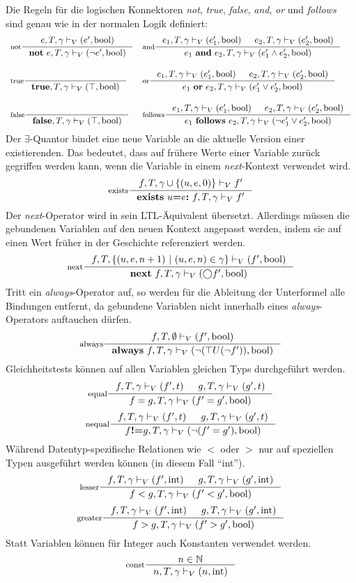 Die Regeln für die logischen Konnektoren \emph{not}, \emph{true}, \emph{false}, \emph{and}, \emph{or} und \emph{follows} sind genau wie in der normalen Logik definiert:
\[
\begin{array}{ll}
  \inference[not]{e,T,\gamma\vdash_V (e',\textrm{bool})}{\textbf{not}\ e,T,\gamma\vdash_V (\lnot e',\textrm{bool})} &
  \inference[and]{e_1,T,\gamma\vdash_V (e_1',\textrm{bool}) & e_2,T,\gamma\vdash_V (e_2',\textrm{bool})}{e_1\ \textbf{and}\ e_2,T,\gamma\vdash_V (e_1'\land e_2',\textrm{bool})}\\[20pt]
  \inference[true]{}{\textbf{true},T,\gamma\vdash_V(\top,\textrm{bool})} &
  \inference[or]{e_1,T,\gamma\vdash_V (e_1',\textrm{bool}) & e_2,T,\gamma\vdash_V (e_2',\textrm{bool})}{e_1\ \textbf{or}\ e_2,T,\gamma\vdash_V (e_1'\lor e_2',\textrm{bool})}\\[20pt]
  \inference[false]{}{\textbf{false},T,\gamma\vdash_V(\top,\textrm{bool})} &
  \inference[follows]{e_1,T,\gamma\vdash_V (e_1',\textrm{bool}) & e_2,T,\gamma\vdash_V (e_2',\textrm{bool})}{e_1\ \textbf{follows}\ e_2,T,\gamma\vdash_V (\lnot e_1'\lor e_2',\textrm{bool})}
\end{array}
\]
Der $\exists$-Quantor bindet eine neue Variable an die aktuelle Version einer existierenden.
Das bedeutet, dass auf frühere Werte einer Variable zurück gegriffen werden kann, wenn die Variable in einem \emph{next}-Kontext verwendet wird.
\[
\inference[exists]{f,T,\gamma\cup\{(u,e,0)\}\vdash_V f'}{\textbf{exists}\ u\textbf{=}e\textbf{:}\ f,T,\gamma\vdash_V f'}
\]
Der \emph{next}-Operator wird in sein LTL-Äquivalent übersetzt.
Allerdings müssen die gebundenen Variablen auf den neuen Kontext angepasst werden, indem sie auf einen Wert früher in der Geschichte referenziert werden.
\[
\inference[next]{f,T,\{ (u,e,n+1)\ |\ (u,e,n)\in\gamma\}\vdash_V (f',\textrm{bool})}{\textbf{next}\ f,T,\gamma\vdash_V (\bigcirc f',\textrm{bool})}
\]
Tritt ein \emph{always}-Operator auf, so werden für die Ableitung der Unterformel alle Bindungen entfernt, da gebundene Variablen nicht innerhalb eines \emph{always}-Operators auftauchen dürfen.
\[
\inference[always]{f,T,\emptyset\vdash_V (f',\textrm{bool})}{\textbf{always}\ f,T,\gamma\vdash_V (\lnot(\top U (\lnot f')),\textrm{bool})}
\]
Gleichheitstests können auf allen Variablen gleichen Typs durchgeführt werden.
\[
\inference[equal]{f,T,\gamma\vdash_V (f',t) & g,T,\gamma\vdash_V (g',t)}{f=g,T,\gamma\vdash_V(f'=g',\textrm{bool})}
\]
\[
\inference[nequal]{f,T,\gamma\vdash_V (f',t) & g,T,\gamma\vdash_V (g',t)}{f\textbf{!=}g,T,\gamma\vdash_V(\lnot(f'=g'),\textrm{bool})}
\]
Während Datentyp-spezifische Relationen wie $<$ oder $>$ nur auf speziellen Typen ausgeführt werden können (in diesem Fall "`int"').
\[
\inference[lesser]{f,T,\gamma\vdash_V (f',\textrm{int}) & g,T,\gamma\vdash_V (g',\textrm{int})}{f<g,T,\gamma\vdash_V(f'<g',\textrm{bool})}
\]
\[
\inference[greater]{f,T,\gamma\vdash_V (f',\textrm{int}) & g,T,\gamma\vdash_V (g',\textrm{int})}{f>g,T,\gamma\vdash_V(f'>g',\textrm{bool})}
\]
Statt Variablen können für Integer auch Konstanten verwendet werden. 
\[
\inference[const]{n\in\mathbb{N}}{n,T,\gamma\vdash_V (n,\textrm{int})}
\]